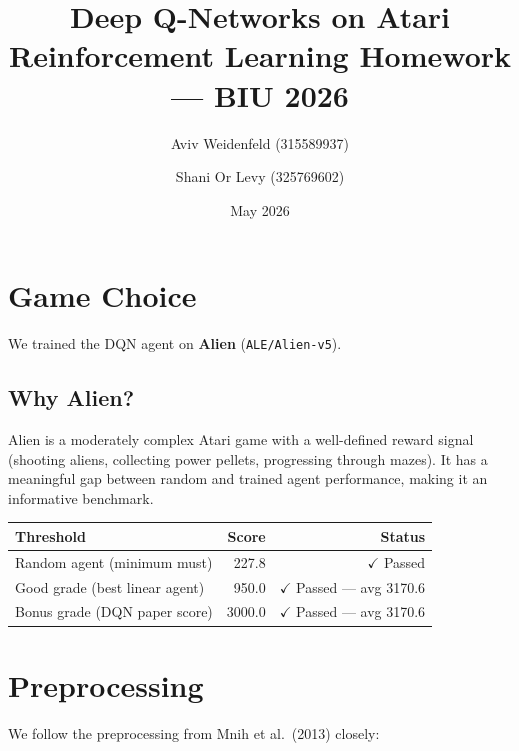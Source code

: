 \documentclass[11pt,a4paper]{article}
\title{\textbf{Deep Q-Networks on Atari}\\
       \large Reinforcement Learning Homework — BIU 2026}
\author{Aviv Weidenfeld (315589937) \and Shani Or Levy (325769602)}
\date{May 2026}
\begin{document}
\maketitle
\tableofcontents
\newpage

\section{Game Choice}

We trained the DQN agent on \textbf{Alien} (\texttt{ALE/Alien-v5}).

\subsection*{Why Alien?}
Alien is a moderately complex Atari game with a well-defined reward signal (shooting aliens,
collecting power pellets, progressing through mazes). It has a meaningful gap between random
and trained agent performance, making it an informative benchmark.

\begin{center}
\begin{tabular}{lrr}
\toprule
\textbf{Threshold} & \textbf{Score} & \textbf{Status} \\
\midrule
Random agent (minimum must) & 227.8 & \textcolor{green!60!black}{$\checkmark$ Passed} \\
Good grade (best linear agent) & 950.0 & \textcolor{green!60!black}{$\checkmark$ Passed — avg 3170.6} \\
Bonus grade (DQN paper score) & 3000.0 & \textcolor{green!60!black}{$\checkmark$ Passed — avg 3170.6} \\
\bottomrule
\end{tabular}
\end{center}

\section{Preprocessing}

We follow the preprocessing from Mnih et al.\ (2013) closely:
\end{document}
